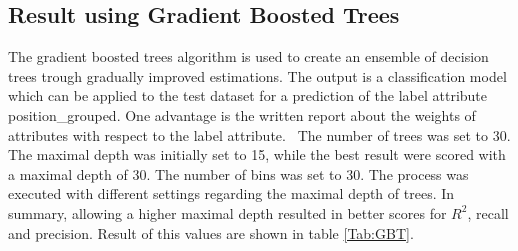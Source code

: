\subsection{Result using Gradient Boosted Trees}

The gradient boosted trees algorithm is used to create an ensemble of decision trees trough gradually improved estimations. The output is a classification model which can be applied to the test dataset for a prediction of the label attribute position\_grouped. 
One advantage is the written report about the weights of attributes with respect to the label attribute.~\cite{ref_rapidminergbt}
The number of trees was set to 30. The maximal depth was initially set to 15, while the best result were scored with a maximal depth of 30.
The number of bins was set to 30.  
The process was executed with different settings regarding the maximal depth of trees. In summary, allowing a higher maximal depth resulted in better scores for $R^2$, recall and precision. Result of this values are shown in table \ref{Tab:GBT}.


